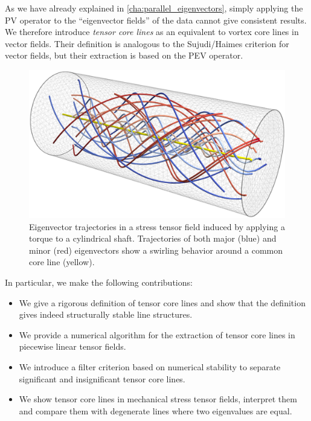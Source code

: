%
As we have already explained in \cref{cha:parallel_eigenvectors}, simply
applying the \ac{PV} operator to the ``eigenvector fields'' of the data cannot
give consistent results.
%
We therefore introduce \emph{tensor core lines} as an equivalent to vortex
core lines in vector fields.
%
Their definition is analogous to the Sujudi/Haimes criterion for vector fields,
but their extraction is based on the \ac{PEV} operator.
%
\begin{figure}[t]
    \centering
    \includegraphics[width=\columnwidth]{figures/torque_tube_lines.png}
    \caption{Eigenvector trajectories in a stress tensor field induced by
             applying a torque to a cylindrical shaft. Trajectories of both
             major (blue) and minor (red) eigenvectors show a swirling behavior
             around a common core line (yellow).
             }
    \label{fig:tube_lines}
\end{figure}
%
In particular, we make the following contributions:
%
\begin{itemize}
    \item  We give a rigorous definition of tensor core lines and show that the
    definition gives indeed structurally stable line structures.
    \item We provide a numerical algorithm for the extraction of tensor core
    lines in piecewise linear tensor fields.
    \item We introduce a filter criterion based on numerical stability to
    separate significant and insignificant tensor core lines.
    \item We show tensor core lines in mechanical stress tensor fields,
    interpret them and compare them with degenerate lines where two eigenvalues
    are equal.
\end{itemize}
%
%
%
%
